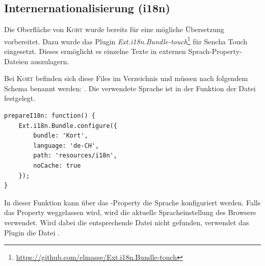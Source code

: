 \subsection{Internernationalisierung (i18n)}
\label{i18n}
Die Oberfläche von \textsc{Kort} wurde bereits für eine mögliche Übersetzung vorbereitet.
Dazu wurde das Plugin \emph{Ext.i18n.Bundle-touch}\footnote{\url{https://github.com/elmasse/Ext.i18n.Bundle-touch}} für Sencha Touch eingesetzt.
Dieses ermöglicht es einzelne Texte in externen Sprach-Property-Dateien auszulagern.

Bei \textsc{Kort} befinden sich diese Files im Verzeichnis  und müssen nach folgendem Schema benannt werden: .
Die verwendete Sprache ist in der Funktion  der Datei  festgelegt.

\lstset{language=JavaScript}
\begin{lstlisting}[caption=kort - Sprache definieren, label=kort-choose-language]
prepareI18n: function() {
	Ext.i18n.Bundle.configure({
		bundle: 'Kort',
		language: 'de-CH',
		path: 'resources/i18n',
		noCache: true
	});
}
\end{lstlisting}

In dieser Funktion kann über das -Property die Sprache konfiguriert werden.
Falls das Property weggelassen wird, wird die aktuelle Spracheinstellung des Browsers verwendet.
Wird dabei die entsprechende Datei nicht gefunden, verwendet das Plugin die Datei .